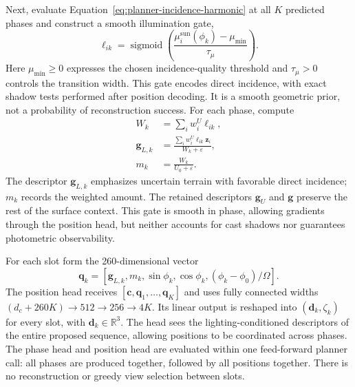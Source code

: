 Next, evaluate Equation~\ref{eq:planner-incidence-harmonic} at all $K$ predicted phases and construct a smooth illumination gate,
\begin{equation}
    \ell_{ik}=\operatorname{sigmoid}
      \left(\frac{\mu_i^{\mathrm{sun}}(\phi_k)-\mu_{\min}}{\tau_\mu}\right).
    \label{eq:planner-light-gate}
\end{equation}
Here $\mu_{\min}\geq0$ expresses the chosen incidence-quality threshold and $\tau_\mu>0$ controls the transition width. This gate encodes direct incidence, with exact shadow tests performed after position decoding. It is a smooth geometric prior, not a probability of reconstruction success. For each phase, compute
\begin{equation}
    \begin{aligned}
        W_k&=\sum_i w_i^U\ell_{ik},\\
        \mathbf g_{L,k}&=\frac{\sum_i w_i^U\ell_{ik}\mathbf z_i}
                                   {W_k+\varepsilon},\\
        m_k&=\frac{W_k}{U_0+\varepsilon}.
    \end{aligned}
    \label{eq:planner-phase-conditioned-pooling}
\end{equation}
The descriptor $\mathbf g_{L,k}$ emphasizes uncertain terrain with favorable direct incidence; $m_k$ records the weighted amount. The retained descriptors $\mathbf g_U$ and $\mathbf g$ preserve the rest of the surface context. This gate is smooth in phase, allowing gradients through the position head, but neither accounts for cast shadows nor guarantees photometric observability.

For each slot form the 260-dimensional vector
\begin{equation}
    \mathbf q_k=
    [\mathbf g_{L,k},m_k,\sin\phi_k,\cos\phi_k,
        (\phi_k-\phi_0)/\Omega].
    \label{eq:planner-phase-token}
\end{equation}
The position head receives $[\mathbf c,\mathbf q_1,\ldots,\mathbf q_K]$ and uses fully connected widths $(d_c+260K)\to512\to256\to4K$. Its linear output is reshaped into $(\mathbf d_k,\zeta_k)$ for every slot, with $\mathbf d_k\in\mathbb R^3$. The head sees the lighting-conditioned descriptors of the entire proposed sequence, allowing positions to be coordinated across phases. The phase head and position head are evaluated within one feed-forward planner call: all phases are produced together, followed by all positions together. There is no reconstruction or greedy view selection between slots.

